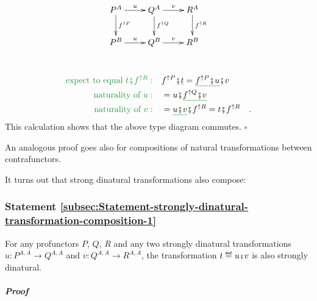 \begin{figure}%
\vspace{-1.3\baselineskip}
\[
\xymatrix{\xyScaleY{1.8pc}\xyScaleX{2.0pc}P^{A}\ar[d]\sp(0.45){f^{\uparrow P}}\ar[r]\sp(0.5){u} & Q^{A}\ar[d]\sp(0.45){f^{\uparrow Q}}\ar[r]\sp(0.5){v} & R^{A}\ar[d]\sp(0.45){f^{\uparrow R}}\\
P^{B}\ar[r]\sp(0.5){u} & Q^{B}\ar[r]\sp(0.5){v} & R^{B}
}
\]
\vspace{-2.8\baselineskip}
\end{figure}%

~\vspace{-1\baselineskip}
\begin{align*}
{\color{greenunder}\text{expect to equal }t\bef f^{\uparrow R}:}\quad & f^{\uparrow P}\bef\gunderline t=\gunderline{f^{\uparrow P}\bef u}\bef v\\
{\color{greenunder}\text{naturality of }u:}\quad & =u\bef\gunderline{f^{\uparrow Q}\bef v}\\
{\color{greenunder}\text{naturality of }v:}\quad & =\gunderline{u\bef v}\bef f^{\uparrow R}=t\bef f^{\uparrow R}\quad.
\end{align*}
This calculation shows that the above type diagram commutes. $\square$

An analogous proof goes also for compositions of natural transformations
between contrafunctors.

It turns out that strong dinatural transformations also compose:

\subsubsection{Statement \label{subsec:Statement-strongly-dinatural-transformation-composition-1}\ref{subsec:Statement-strongly-dinatural-transformation-composition-1}}

For any profunctors $P$, $Q$, $R$ and any two strongly dinatural
transformations $u:P^{A,A}\rightarrow Q^{A,A}$ and $v:Q^{A,A}\rightarrow R^{A,A}$,
the transformation $t\triangleq u\bef v$ is also strongly dinatural.

\subparagraph{Proof}

